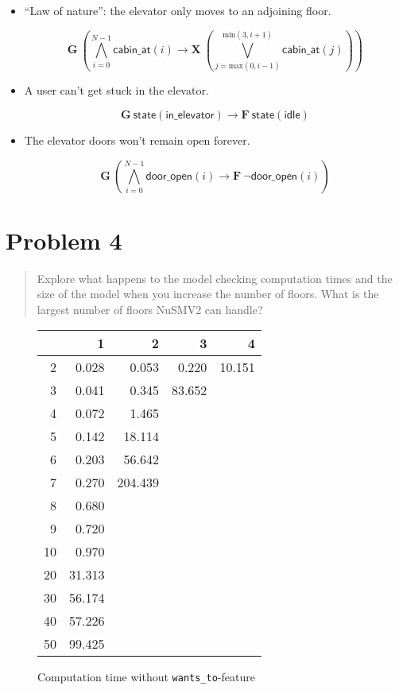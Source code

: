 \documentclass[a4paper,10pt]{article}
\newcommand{\LTLG}{\mathbf{G~}}
\newcommand{\LTLF}{\mathbf{F~}}
\newcommand{\LTLX}{\mathbf{X~}}
\newcommand{\disjall}[2]{\mathop{\bigvee}\limits_{#1}^{#2}}
\newcommand{\conjall}[2]{\mathop{\bigwedge}\limits_{#1}^{#2}}
\newcommand{\dooropen}[1]{\mathsf{door\_open}(#1)}
\newcommand{\cabinat}[1]{\mathsf{cabin\_at}(#1)}
\newcommand{\state}[1]{\mathsf{state}(\mathsf{#1})}
\newcommand{\imply}{\rightarrow}
\begin{document}
	\begin{itemize}
		\item
			``Law of nature'': the elevator only moves to an adjoining floor.
			
			\[
				\LTLG \left( \conjall{i=0}{N-1} \cabinat{i} \imply \LTLX \left( \disjall{j=\textrm{max}(0, i-1)}{\textrm{min}(3, i+1)} \cabinat{j} \right) \right)
			\]
		
		\item
			A user can't get stuck in the elevator.
			
			\[
				\LTLG \state{in\_elevator} \imply \LTLF \state{idle}
			\]
		
		\item
			The elevator doors won't remain open forever.
			
			\[
				\LTLG \left( \conjall{i=0}{N-1} \dooropen{i} \imply \LTLF \neg \dooropen{i} \right)
			\]
	\end{itemize}
	
	\section{Problem 4}
	
	\begin{quote}
		Explore what happens to the model checking computation times and the size of the model when you increase the number of floors. What is the largest number of floors NuSMV2 can handle?
	\end{quote}
	
	\begin{figure}[H]
		\begin{center}
			\begin{tabular}{r|r|r|r|r}
				\backslashbox{$F$}{$n$} & 1 & 2 & 3 & 4 \\ \hline
				2	& 0.028		& 0.053		& 0.220		& 10.151	\\ \hline
				3	& 0.041		& 0.345		& 83.652	&			\\ \hline
				4	& 0.072		& 1.465		&			&			\\ \hline
				5	& 0.142		& 18.114	&			&			\\ \hline
				6	& 0.203		& 56.642	&			&			\\ \hline 
				7	& 0.270		& 204.439	&			&			\\ \hline
				8	& 0.680		&			&			&			\\ \hline
				9	& 0.720		&			&			&			\\ \hline
				10	& 0.970		&			&			&			\\ \hline
				20	& 31.313	&			&			&			\\ \hline
				30	& 56.174	&			&			&			\\ \hline
				40	& 57.226	&			&			&			\\ \hline
				50	& 99.425	&			&			&			\\ \hline
			\end{tabular}
		\end{center}
		
		\caption{Computation time without \texttt{wants\_to}-feature}
	\end{figure}
	
\end{document}
